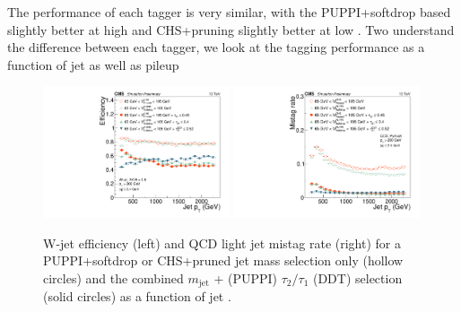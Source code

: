 The performance of each tagger is very similar, with the PUPPI+softdrop based slightly better at high \PT and CHS+pruning slightly better at low \PT.
Two understand the difference between each tagger, we look at the tagging performance as a function of jet \PT as well as pileup

\begin{figure}[htbp]
\centering
\includegraphics[width=0.49\textwidth]{figures/vtagging/JME-16-003/BoostedW/WtagSigEffvsPT.pdf}
\includegraphics[width=0.49\textwidth]{figures/vtagging/JME-16-003/BoostedW/QCDBkgEffvsPT.pdf}
\caption{W-jet efficiency (left) and QCD light jet mistag rate (right) for a PUPPI+softdrop or CHS+pruned jet mass selection only (hollow circles) and the combined $m_{\mathrm{jet}}$ + (PUPPI) $\tau_2/\tau_1$ (DDT) selection (solid circles) as a function of jet \PT.}
\label{fig:searchII:effvspt}
\end{figure}

